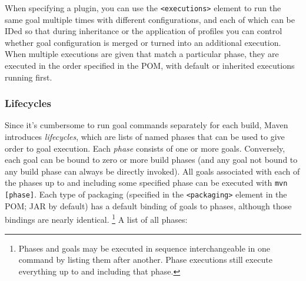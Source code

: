 \documentclass[8pt, table, xcdraw]{article}%
\begin{document}
When specifying a plugin, you can use the \lstinline{<executions>} element to run the same goal multiple times with different configurations, and each of which can be IDed so that during inheritance or the application of profiles you can control whether goal configuration is merged or turned into an additional execution. When multiple executions are given that match a particular phase, they are executed in the order specified in the POM, with default or inherited executions running first.

\subsubsection{Lifecycles}

Since it's cumbersome to run goal commands separately for each build, Maven introduces \emph{lifecycles}, which are lists of named phases that can be used to give order to goal execution. Each \emph{phase} consists of one or more goals. Conversely, each goal can be bound to zero or more build phases (and any goal not bound to any build phase can always be directly invoked). All goals associated with each of the phases up to and including some specified phase can be executed with \lstinline{mvn [phase]}. Each type of packaging (specified in the \lstinline{<packaging>} element in the POM; JAR by default) has a default binding of goals to phases, although those bindings are nearly identical. \footnote{Phases and goals may be executed in sequence interchangeable in one command by listing them after another. Phase executions still execute everything up to and including that phase.} A list of all phases:
\end{document}
